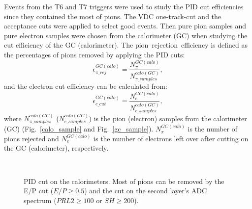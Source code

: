 Events from the T6 and T7 triggers were used to study the PID cut efficiencies since they contained the most of pions. The VDC one-track-cut and the acceptance cuts were applied to select good events. Then pure pion samples and pure electron samples were chosen from the calorimeter (GC) when studying the cut efficiency of the GC (calorimeter). The pion~rejection~efficiency is defined as the percentages of pions removed by applying the PID cuts:
\begin{equation}
\epsilon_{\pi\_rej}^{GC(calo)} = \frac{N_{\pi}^{GC(calo)}}{N_{\pi\_samples}^{calo(GC)}}, 
\label{cut_eff_pi}
\end{equation}
  and the electron cut efficiency can be calculated from:
\begin{equation}
   \epsilon_{e\_cut}^{GC(calo)} = \frac{N_{e}^{GC(calo)}}{N_{e\_samples}^{calo(GC)}},
   \label{cut_eff_e}
\end{equation}
where $N_{\pi\_samples}^{calo(GC)}$ ($N_{e\_samples}^{calo(GC)}$) is the pion (electron) samples from the calorimeter (GC) (Fig.~\ref{calo_sample} and Fig.~\ref{gc_sample}). $N_{\pi}^{GC(calo)}$ is the number of pions rejected and $N_{e}^{GC(calo)}$ is the number of electrons left over after cutting on the GC (calorimeter), respectively. 
\begin{figure}[!ht]
  \begin{center}
    \\
    \caption[PID cut on the calorimeters]{\footnotesize{PID cut on the calorimeters. Most of pions can be removed by the E/P cut ($E/P\geq 0.5$) and the cut on the second layer's ADC spectrum ($PRL2\geq 100$ or $SH\geq 200$).}}
    \label{calo_eff}
  \end{center}
\end{figure}

